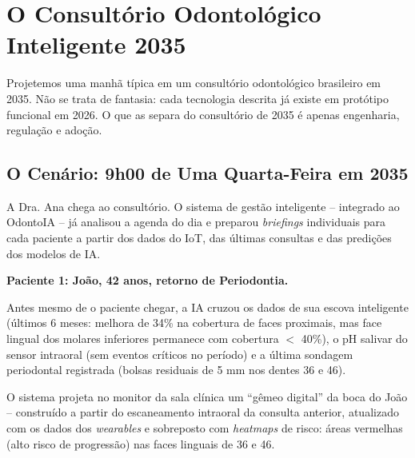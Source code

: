 
\section{O Consultório Odontológico Inteligente 2035}
\label{sec:consultorio-2035}

\nivelquatro

Projetemos uma manhã típica em um consultório odontológico brasileiro em 2035.
Não se trata de fantasia: cada tecnologia descrita já existe em protótipo
funcional em 2026. O que as separa do consultório de 2035 é apenas engenharia,
regulação e adoção.


\subsection{O Cenário: 9h00 de Uma Quarta-Feira em 2035}

A Dra. Ana chega ao consultório. O sistema de gestão inteligente -- integrado
ao OdontoIA -- já analisou a agenda do dia e preparou \textit{briefings}
individuais para cada paciente a partir dos dados do IoT, das últimas consultas
e das predições dos modelos de IA.

\textbf{Paciente 1: João, 42 anos, retorno de Periodontia.}

Antes mesmo de o paciente chegar, a IA cruzou os dados de sua escova inteligente
(últimos 6 meses: melhora de 34\% na cobertura de faces proximais, mas face
lingual dos molares inferiores permanece com cobertura $<$ 40\%), o pH salivar
do sensor intraoral (sem eventos críticos no período) e a última sondagem
periodontal registrada (bolsas residuais de 5 mm nos dentes 36 e 46).

O sistema projeta no monitor da sala clínica um ``gêmeo digital'' da boca do
João -- construído a partir do escaneamento intraoral da consulta anterior,
atualizado com os dados dos \textit{wearables} e sobreposto com \textit{
heatmaps} de risco: áreas vermelhas (alto risco de progressão) nas faces
linguais de 36 e 46.

